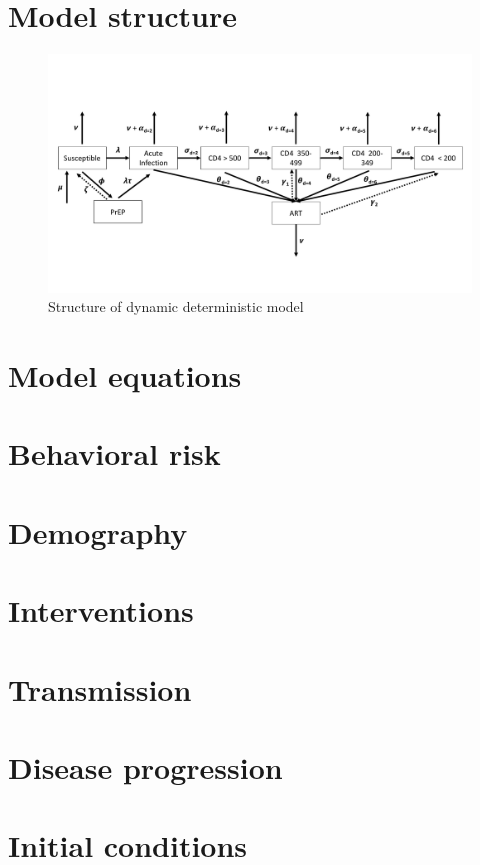 \documentclass[11pt,a4paper]{article}
\begin{document}
\section{Model structure}
\begin{figure}[H]
\centering
\caption{Structure of dynamic deterministic model}
\includegraphics[width = 175mm]{prep-dc2m-diagram.pdf}
\end{figure}

\section{Model equations}

\section{Behavioral risk}

\section{Demography}

\section{Interventions}

\section{Transmission}

\section{Disease progression}

\section{Initial conditions}
\end{document}
